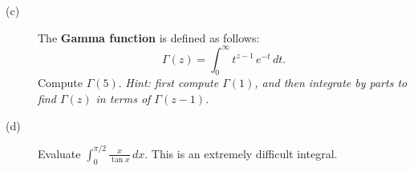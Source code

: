 \documentclass[12pt]{article}
\begin{document}
\begin{description}
\vfill

\item[(c)] The \textbf{Gamma function} is defined as follows:
$$
\Gamma(z) = \int_0^\infty t^{z-1} \, e^{-t} \, dt.
$$
Compute $\Gamma(5)$.  \textit{Hint: first compute $\Gamma(1)$, and then integrate by parts to find $\Gamma(z)$ in terms of $\Gamma(z-1)$.}

\vfill

\item[(d)] Evaluate $\displaystyle\int_0^{\pi/2} \displaystyle\frac{x}{\tan x} \, dx$.
This is an extremely difficult integral.

\vfill


%

\end{description}

\pagebreak
\null
\end{document}
